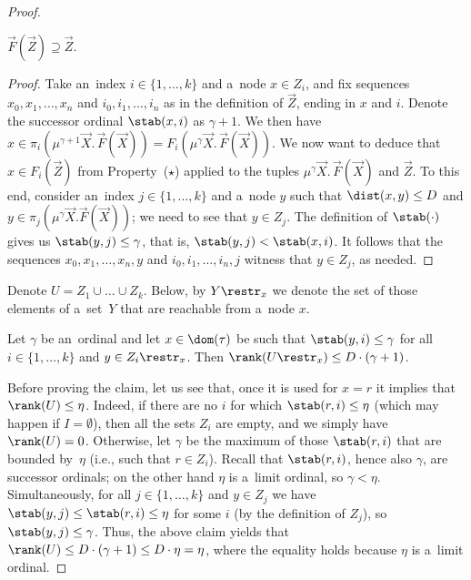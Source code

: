 \documentclass{lmcs}
\numberwithin{equation}{section}
\numberwithin{figure}{section}
\begin{document}
\begin{proof}
	\begin{clm}
		$\vec{F}(\vec{Z})\supseteq\vec{Z}$.
	\end{clm}

	\begin{proof}
		Take an~index $i\in\{1,\dots,k\}$ and a~node $x\in Z_i$, and fix sequences $x_0,x_1,\dots,x_n$ and $i_0,i_1,\dots,i_n$ as in the definition of $\vec{Z}$, ending in $x$ and $i$.
		Denote the successor ordinal $\stab(x,i)$ as $\gamma+1$.
		We then have $x\in\pi_i(\mu^{\gamma+1}\vec{X}.\,\vec{F}(\vec{X}))=F_i(\mu^\gamma\vec{X}.\,\vec{F}(\vec{X}))$.
		We now want to deduce that $x\in F_i(\vec{Z})$ from Property~($\star$) applied to the tuples $\mu^\gamma\vec{X}.\,\vec{F}(\vec{X})$ and $\vec{Z}$.
		To this end, consider an~index $j\in\{1,\dots,k\}$ and a~node $y$ such that $\dist(x,y)\leq D$ and $y\in\pi_j(\mu^\gamma\vec{X}.\vec{F}(\vec{X}))$;
		we need to see that $y\in Z_j$.
		The definition of $\stab(\cdot)$ gives us $\stab(y,j)\leq\gamma$, that is, $\stab(y,j)<\stab(x,i)$.
		It follows that the sequences $x_0,x_1,\dots,x_n,y$ and $i_0,i_1,\dots,i_n,j$ witness that $y\in Z_j$, as needed.
	\end{proof}
	
	Denote $U=Z_1\cup\dots\cup Z_k$.
	Below, by $Y\restr_x$ we denote the set of those elements of a~set~$Y$ that are reachable from a~node $x$.
	
	\begin{clm}\label{clm:2}
		Let $\gamma$ be an~ordinal and let $x\in\dom(\tau)$ be such that $\stab(y,i)\leq\gamma$ for all $i\in\{1,\dots,k\}$ and $y\in Z_i\restr_x$.
		Then $\rank(U\restr_x)\leq D\cdot(\gamma+1)$.
	\end{clm}
		
	Before proving the claim, let us see that, once it is used for $x=r$ it implies that $\rank(U)\leq\eta$.
	Indeed, if there are no $i$ for which $\stab(r,i)\leq\eta$ (which may happen if $I=\emptyset$), then all the sets $Z_i$ are empty, and we simply have $\rank(U)=0$.
	Otherwise, let $\gamma$ be the maximum of those $\stab(r,i)$ that are bounded by~$\eta$ (i.e., such that $r\in Z_i$).
	Recall that $\stab(r,i)$, hence also $\gamma$, are successor ordinals; on the other hand $\eta$ is a~limit ordinal, so $\gamma<\eta$.
	Simultaneously, for all $j\in\{1,\dots,k\}$ and $y\in Z_j$ we have $\stab(y,j)\leq\stab(r,i)\leq\eta$ for some $i$ (by the definition of $Z_j$), so $\stab(y,j)\leq\gamma$.
	Thus, the above claim yields that $\rank(U)\leq D\cdot(\gamma+1)\leq D\cdot\eta=\eta$, where the equality holds because $\eta$ is a~limit ordinal.
	

\end{proof}
\end{document}
